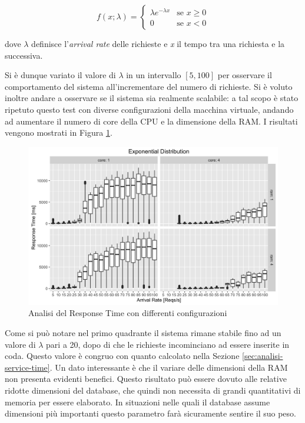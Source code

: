 \begin{equation}
	f(x;\lambda) = 
	\begin{cases}
		\lambda e^{-\lambda x} & \text{se } x \ge 0 \\
		0 & \text{se } x < 0
	\end{cases}
\end{equation}

dove $ \lambda $ definisce l'\emph{arrival rate} delle richieste e \emph{x} il tempo tra una richiesta e la successiva.

Si è dunque variato il valore di $ \lambda $ in un intervallo $ [5, 100] $ per osservare il comportamento del sistema all'incrementare del numero di richieste. Si è voluto inoltre andare a osservare se il sistema sia realmente scalabile: a tal scopo è stato ripetuto questo test con diverse configurazioni della macchina virtuale, andando ad aumentare il numero di core della CPU e la dimensione della RAM. I risultati vengono mostrati in Figura \ref{fig:exponential-analysis}.

\begin{figure}[ht]
	\centering
	\includegraphics[width=\textwidth]{7-performance/Immagini/exponential_analysis.png}
	\caption{Analisi del Response Time con differenti configurazioni}\label{fig:exponential-analysis}
\end{figure}

Come si può notare nel primo quadrante il sistema rimane stabile fino ad un valore di $ \lambda $ pari a 20, dopo di che le richieste incominciano ad essere inserite in coda. Questo valore è congruo con quanto calcolato nella Sezione \ref{sec:analisi-service-time}. Un dato interessante è che il variare delle dimensioni della RAM non presenta evidenti benefici. Questo risultato può essere dovuto alle relative ridotte dimensioni del database, che quindi non necessita di grandi quantitativi di memoria per essere elaborato. In situazioni nelle quali il database assume dimensioni più importanti questo parametro farà sicuramente sentire il suo peso.

